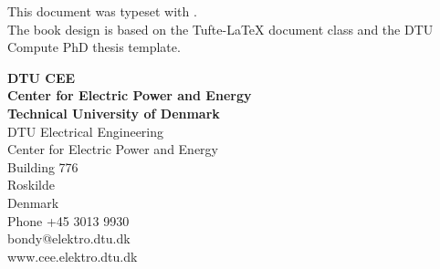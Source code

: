 \thispagestyle{empty} %
\frieze
\vspace*{\fill}
{\noindent
This document was typeset with \XeLaTeX.\\
\noindent
The book design is based on the Tufte-\LaTeX{} document class and the DTU Compute PhD thesis template.\\
\vspace{5cm}
\scriptsize

\sffamily
\noindent
\textbf{DTU CEE}\\
\noindent
\textbf{Center for Electric Power and Energy}\\
\noindent
\textbf{Technical University of Denmark}\\
\noindent
\vspace{0.5cm}
\noindent
DTU Electrical Engineering\\
\noindent
Center for Electric Power and Energy\\
\noindent
Building 776\\
 Roskilde\\
\noindent
Denmark\\
\noindent
Phone +45 3013 9930\\
\noindent
bondy@elektro.dtu.dk\\
\noindent
www.cee.elektro.dtu.dk\\
\noindent
\normalsize
\normalfont}
\vspace*{2.5cm}
